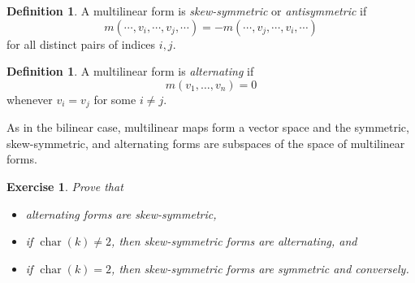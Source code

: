 \documentclass[12pt]{article}
\theoremstyle{plain}
\newtheorem{exercise}[theorem]{Exercise}
\theoremstyle{definition}
\newtheorem{definition}[theorem]{Definition}
\theoremstyle{remark}
\numberwithin{equation}{section}
\begin{document}
\begin{definition}
A multilinear form is \emph{skew-symmetric} or \emph{antisymmetric} if
\[
m(\cdots,v_i,\cdots,v_j,\cdots) = -m(\cdots,v_j,\cdots,v_i,\cdots)
\]
for all distinct pairs of indices $i,j$.
\end{definition}

\begin{definition}
A multilinear form is \emph{alternating} if
\[
m(v_1,\ldots,v_n) = 0
\]
whenever $v_i=v_j$ for some $i \ne j$.
\end{definition}

As in the bilinear case, multilinear maps form a vector space and the
symmetric, skew-symmetric, and alternating forms are subspaces of the
space of multilinear forms.

\begin{exercise}
Prove that
\begin{itemize}
\item alternating forms are skew-symmetric,
\item if $\operatorname{char}(k) \ne 2$, then skew-symmetric forms are
alternating, and
\item if $\operatorname{char}(k) = 2$, then skew-symmetric forms are
symmetric and conversely.
\end{itemize}
\end{exercise}




\end{document}
